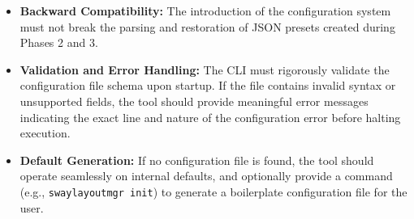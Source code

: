\begin{itemize}
    \item \textbf{Backward Compatibility:} The introduction of the configuration system must not break the parsing and restoration of JSON presets created during Phases 2 and 3.
    \item \textbf{Validation and Error Handling:} The CLI must rigorously validate the configuration file schema upon startup. If the file contains invalid syntax or unsupported fields, the tool should provide meaningful error messages indicating the exact line and nature of the configuration error before halting execution.
    \item \textbf{Default Generation:} If no configuration file is found, the tool should operate seamlessly on internal defaults, and optionally provide a command (e.g., \texttt{swaylayoutmgr init}) to generate a boilerplate configuration file for the user.
\end{itemize}